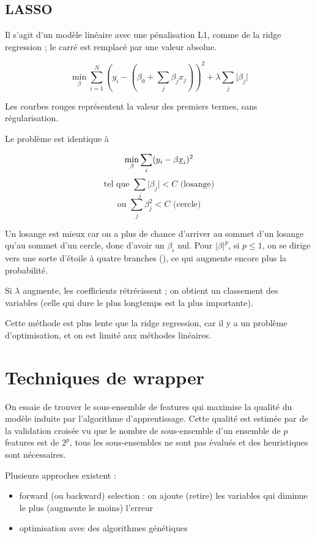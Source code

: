 	\subsection{LASSO}
	
	Il s'agit d'un modèle linéaire avec une pénalisation L1, comme de la ridge regression ; le carré est remplacé par une valeur absolue.
	
	$$\min_{\beta} \sum_{i = 1}^N (y_i -(\beta_0 + \sum_j \beta_j x_j))^2 + \lambda \sum_j \vert \beta_j \vert$$
	
	Les courbes rouges représentent la valeur des premiers termes, sans régularisation.
	
	
	
	Le problème est identique à
	
	$$\min_{\beta} \sum_i (y_i - \beta \underline{x}_i)^2$$
	$$\text{tel que } \sum_j \vert \beta_j \vert < C \text{ (losange)}$$
	$$\text{ou  } \sum_j  \beta_j^2  < C \text{ (cercle)}$$
	
	Un losange est mieux car on a plus de chance d'arriver au sommet d'un losange qu'au sommet d'un cercle, donc d'avoir un $\beta_i$ nul. Pour $\vert \beta \vert^p$, si $p \leq 1$, on se dirige vers une sorte d'étoile à quatre branches (), ce qui augmente encore plus la probabilité.
	
	Si $\lambda$ augmente, les coefficients rétrécissent ; on obtient un classement des variables (celle qui dure le plus longtemps est la plus importante).
	
	
	Cette méthode est plus lente que la ridge regression, car il y a un problème d'optimisation, et on est limité aux méthodes linéaires.
	
\section{Techniques de wrapper}

On essaie de trouver le sous-ensemble de features qui maximise la qualité du modèle induite par l'algorithme d'apprentissage. Cette qualité est estimée par de la validation croisée  vu que le nombre de sous-ensemble d'un ensemble de $p$ features est de $2^p$, tous les sous-ensembles ne sont pas évalués et des heuristiques sont nécessaires.

Plusieurs approches existent :

\begin{itemize}
	\item forward (ou backward) selection : on ajoute (retire) les variables qui diminue le plus (augmente le moins) l'erreur
	\item optimisation avec des algorithmes génétiques
\end{itemize}

